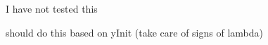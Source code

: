 
\begin{DoxyRefList}
\item[\label{todo__todo000001}%
\Hypertarget{todo__todo000001}%
Member \hyperlink{qpoases_cutest_8cpp_ae66f6b31b5ad750f1fe042a706a4e3d4}{main} ()]I have not tested this 

should do this based on y\+Init (take care of signs of lambda) 
\end{DoxyRefList}